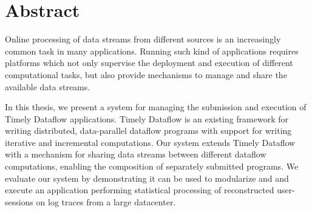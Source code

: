 \begingroup
\let\clearpage\relax
\let\cleardoublepage\relax
\let\cleardoublepage\relax

\chapter*{Abstract}

Online processing of data streams from different sources is an increasingly
common task in many applications. Running such kind of applications requires
platforms which not only supervise the deployment and execution of different
computational tasks, but also provide mechanisms to manage and share the
available data streams.

In this thesis, we present a system for managing the submission and execution
of Timely Dataflow applications. Timely Dataflow is an existing framework for
writing distributed, data-parallel dataflow programs with support for writing
iterative and incremental computations. Our system extends Timely Dataflow
with a mechanism for sharing data streams between different dataflow computations,
enabling the composition of separately submitted programs. We evaluate our system
by demonstrating it can be used to modularize and and execute an application
performing statistical processing of reconstructed user-sessions on
log traces from a large datacenter.

\endgroup
